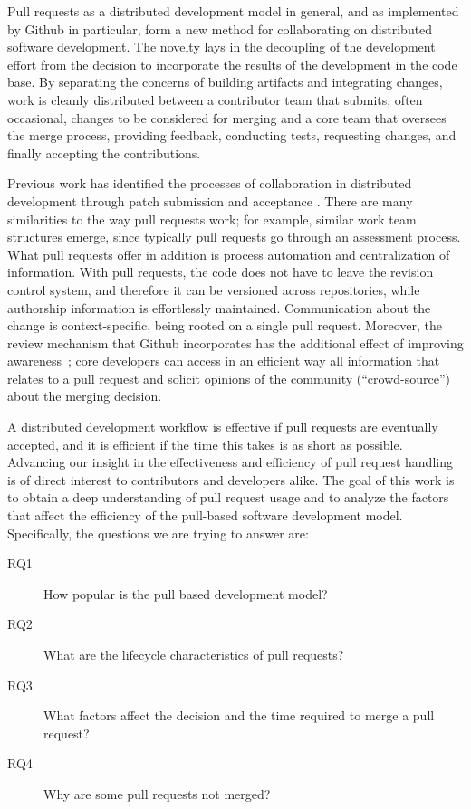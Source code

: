 \documentclass{sig-alternate}
\begin{document}
Pull requests as a distributed development model in general, and as implemented
by Github in particular, form a new method for collaborating on distributed
software development. The novelty lays in the decoupling of the development
effort from the decision to incorporate the results of the development in the
code base. By separating the concerns of building artifacts and integrating
changes, work is cleanly distributed between a contributor team that submits, often
occasional, changes to be considered for merging and a core team that oversees
the merge process, providing feedback, conducting tests, requesting changes, and
finally accepting the contributions.

Previous work has identified the processes of collaboration in distributed
development through patch submission and acceptance \cite{MOCKU02, Bird07,
Weiss08}. There are many similarities to the way pull requests work; for
example, similar work team structures emerge, since typically pull requests go
through an assessment process. What pull requests offer in addition is
process automation and centralization of information. With pull requests, the
code does not have to leave the revision control system, and therefore it can be
versioned across repositories, while authorship information is effortlessly
maintained. Communication about the change is context-specific, being rooted on
a single pull request. Moreover, the review mechanism that Github incorporates
has the additional effect of improving awareness~\cite{Dabbi12}; core developers
can access in an efficient way all information that relates to a pull request
and solicit opinions of the community (``crowd-source'') about the merging
decision.

A distributed development workflow is effective if pull requests are eventually
accepted, and it is efficient if the time this takes is as short as possible.
Advancing our insight in the effectiveness and efficiency of pull request
handling is of direct interest to contributors and developers alike. The goal of
this work is to obtain a deep understanding of pull request usage and to analyze
the factors that affect the efficiency of the pull-based software development
model. Specifically, the questions we are trying to answer are: 

\begin{description}
  
  \item[RQ1] How popular is the pull based development model?

  \item[RQ2] What are the lifecycle characteristics of pull requests?
    
  \item[RQ3] What factors affect the decision and the time required to merge a pull request?

  \item[RQ4] Why are some pull requests not merged?

\end{description}
\end{document}
